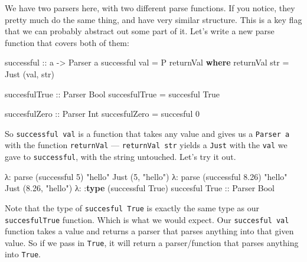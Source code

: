 \documentclass[]{article}
\newenvironment{Shaded}{}{}
\newcommand{\KeywordTok}[1]{\textcolor[rgb]{0.00,0.44,0.13}{\textbf{{#1}}}}
\newcommand{\DataTypeTok}[1]{\textcolor[rgb]{0.56,0.13,0.00}{{#1}}}
\newcommand{\DecValTok}[1]{\textcolor[rgb]{0.25,0.63,0.44}{{#1}}}
\newcommand{\FloatTok}[1]{\textcolor[rgb]{0.25,0.63,0.44}{{#1}}}
\newcommand{\StringTok}[1]{\textcolor[rgb]{0.25,0.44,0.63}{{#1}}}
\newcommand{\OtherTok}[1]{\textcolor[rgb]{0.00,0.44,0.13}{{#1}}}
\newcommand{\FunctionTok}[1]{\textcolor[rgb]{0.02,0.16,0.49}{{#1}}}
\newcommand{\NormalTok}[1]{{#1}}
\begin{document}
We have two parsers here, with two different parse functions. If you
notice, they pretty much do the same thing, and have very similar
structure. This is a key flag that we can probably abstract out some
part of it. Let's write a new parse function that covers both of them:

\begin{Shaded}
\begin{Highlighting}[]
\OtherTok{successful ::} \NormalTok{a }\OtherTok{->} \DataTypeTok{Parser} \NormalTok{a}
\NormalTok{successful val }\FunctionTok{=} \DataTypeTok{P} \NormalTok{returnVal}
    \KeywordTok{where}
        \NormalTok{returnVal str }\FunctionTok{=} \DataTypeTok{Just} \NormalTok{(val, str)}

\OtherTok{succesfulTrue ::} \DataTypeTok{Parser} \DataTypeTok{Bool}
\NormalTok{succesfulTrue }\FunctionTok{=} \NormalTok{succesful }\DataTypeTok{True}

\OtherTok{succesfulZero ::} \DataTypeTok{Parser} \DataTypeTok{Int}
\NormalTok{succesfulZero }\FunctionTok{=} \NormalTok{succesful }\DecValTok{0}
\end{Highlighting}
\end{Shaded}

So \texttt{successful\ val} is a function that takes any value and gives
us a \texttt{Parser\ a} with the function \texttt{returnVal} ---
\texttt{returnVal\ str} yields a \texttt{Just} with the \texttt{val} we
gave to \texttt{successful}, with the string untouched. Let's try it
out.

\begin{Shaded}
\begin{Highlighting}[]
\NormalTok{λ}\FunctionTok{:} \NormalTok{parse (successful }\DecValTok{5}\NormalTok{) }\StringTok{"hello"}
\DataTypeTok{Just} \NormalTok{(}\DecValTok{5}\NormalTok{, }\StringTok{"hello"}\NormalTok{)}
\NormalTok{λ}\FunctionTok{:} \NormalTok{parse (successful }\FloatTok{8.26}\NormalTok{) }\StringTok{"hello"}
\DataTypeTok{Just} \NormalTok{(}\FloatTok{8.26}\NormalTok{, }\StringTok{"hello"}\NormalTok{)}
\NormalTok{λ}\FunctionTok{:} \FunctionTok{:}\KeywordTok{type} \NormalTok{(successful }\DataTypeTok{True}\NormalTok{)}
\NormalTok{succesful }\DataTypeTok{True}\OtherTok{ ::} \DataTypeTok{Parser} \DataTypeTok{Bool}
\end{Highlighting}
\end{Shaded}

Note that the type of \texttt{succesful\ True} is exactly the same type
as our \texttt{succesfulTrue} function. Which is what we would expect.
Our \texttt{succesful\ val} function takes a value and returns a parser
that parses anything into that given value. So if we pass in
\texttt{True}, it will return a parser/function that parses anything
into \texttt{True}.
\end{document}

